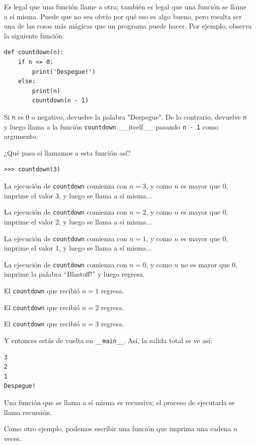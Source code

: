 Es legal que una función llame a otra; también es legal que una función se llame a sí misma. Puede que no sea obvio por qué eso es algo bueno, pero resulta ser una de las cosas más mágicas que un programa puede hacer. Por ejemplo, observa la siguiente función:

\begin{lstlisting}
def countdown(n):
    if n <= 0:
        print('Despegue!')
    else:
        print(n)
        countdown(n - 1)
\end{lstlisting}

Si \texttt{n} es 0 o negativo, devuelve la palabra "Despegue". De lo contrario, devuelve \texttt{n} y luego llama a la función \texttt{countdown} \_\_itself\_\_ pasando \texttt{n - 1} como argumento.

¿Qué pasa si llamamos a esta función así?

\begin{lstlisting}
>>> countdown(3)
\end{lstlisting}

La ejecución de \texttt{countdown} comienza con $n=3$, y como $n$ es mayor que 0, imprime el valor 3, y luego se llama a sí misma...

\quad La ejecución de \texttt{countdown} comienza con $n=2$, y como $n$ es mayor que 0, imprime el valor 2, y luego se llama a sí misma...

\quad\quad La ejecución de \texttt{countdown} comienza con $n=1$, y como $n$ es mayor que 0, imprime el valor 1, y luego se llama a sí misma...

\quad\quad\quad La ejecución de \texttt{countdown} comienza con $n=0$, y como $n$ no es mayor que 0, imprime la palabra ``Blastoff!'' y luego regresa.

\quad\quad El \texttt{countdown} que recibió $n=1$ regresa.

\quad El \texttt{countdown} que recibió $n=2$ regresa.

El \texttt{countdown} que recibió $n=3$ regresa.

Y entonces estás de vuelta en \texttt{\_\_main\_\_}. Así, la salida total se ve así:

\begin{lstlisting}
3
2
1
Despegue!
\end{lstlisting}

Una función que se llama a sí misma es recursiva; el proceso de ejecutarla se llama recursión.

Como otro ejemplo, podemos escribir una función que imprima una cadena $n$ veces.

